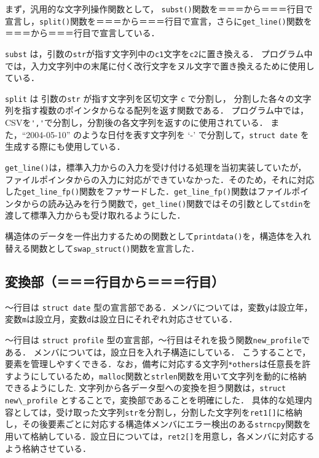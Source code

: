 \documentclass[a4j,11pt]{jarticle}
\begin{document}
まず，汎用的な文字列操作関数として，
\verb|subst()|関数を＝＝＝から＝＝＝行目で宣言し，\verb|split()|関数を＝＝＝から＝＝＝行目で宣言，さらに\verb|get_line()|関数を＝＝＝から＝＝＝行目で宣言している．

\verb|subst| は，引数の\verb|str|が指す文字列中の\verb|c1|文字を\verb|c2|に置き換える．
プログラム中では，入力文字列中の末尾に付く改行文字をヌル文字で置き換えるために使用している．

\verb|split| は 引数の\verb|str| が指す文字列を区切文字 \verb|c| で分割し，
分割した各々の文字列を指す複数のポインタからなる配列を返す関数である．
プログラム中では，CSVを\verb|','|で分割し，分割後の各文字列を返すのに使用されている．
また，``2004-05-10'' のような日付を表す文字列を `-' で分割して，\verb|struct date| を生成する際にも使用している．

\verb|get_line()|は，標準入力からの入力を受け付ける処理を当初実装していたが，ファイルポインタからの入力に対応ができていなかった．そのため，それに対応した\verb|get_line_fp()|関数をファサードした．\verb|get_line_fp()|関数はファイルポインタからの読み込みを行う関数で，\verb|get_line()|関数ではその引数として\verb|stdin|を渡して標準入力からも受け取れるようにした．

構造体のデータを一件出力するための関数として\verb|printdata()|を，構造体を入れ替える関数として\verb|swap_struct()|関数を宣言した．
\subsection{変換部（＝＝＝行目から＝＝＝行目）}

〜行目は \verb|struct date| 型の宣言部である．メンバについては，変数\verb|y|は設立年，変数\verb|m|は設立月，変数\verb|d|は設立日にそれぞれ対応させている．

〜行目は \verb|struct profile| 型の宣言部，〜行目はそれを扱う関数\verb|new_profile|である．
メンバについては，設立日を入れ子構造にしている．
こうすることで，要素を管理しやすくできる．なお，備考に対応する文字列\verb|*others|は任意長を許すようにしているため，\verb|malloc|関数と\verb|strlen|関数を用いて文字列を動的に格納できるようにした. 
文字列から各データ型への変換を担う関数は，\verb|struct new\_profile| とすることで，変換部であることを明確にした．
具体的な処理内容としては，受け取った文字列\verb|str|を分割し，分割した文字列を\verb|ret1[]|に格納し，その後要素ごとに対応する構造体メンバにエラー検出のある\verb|strncpy|関数を用いて格納している．設立日については，\verb|ret2[]|を用意し，各メンバに対応するよう格納させている．
\end{document}
